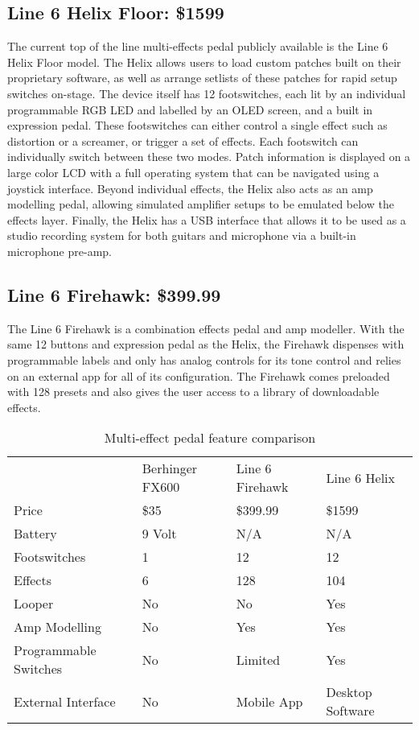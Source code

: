 \documentclass[journal,onecolumn,draftclsnofoot]{IEEEtran}
\begin{document}
\subsection{Line 6 Helix Floor: \$1599 \cite{helix}}
The current top of the line multi-effects pedal publicly available is the Line 6 Helix Floor model. The Helix allows users to load custom patches built on their proprietary software, as well as arrange setlists of these patches for rapid setup switches on-stage. The device itself has 12 footswitches, each lit by an individual programmable RGB LED and labelled by an OLED screen, and a built in expression pedal. These footswitches can either control a single effect such as distortion or a screamer, or trigger a set of effects. Each footswitch can individually switch between these two modes. Patch information is displayed on a large color LCD with a full operating system that can be navigated using a joystick interface. Beyond individual effects, the Helix also acts as an amp modelling pedal, allowing simulated amplifier setups to be emulated below the effects layer. Finally, the Helix has a USB interface that allows it to be used as a studio recording system for both guitars and microphone via a built-in microphone pre-amp.
\subsection{Line 6 Firehawk: \$399.99 \cite{firehawk}}
The Line 6 Firehawk is a combination effects pedal and amp modeller. With the same 12 buttons and expression pedal as the Helix, the Firehawk dispenses with programmable labels and only has analog controls for its tone control and relies on an external app for all of its configuration. The Firehawk comes preloaded with 128 presets and also gives the user access to a library of downloadable effects.
\begin{table}[]
\begin{tabularx}{\linewidth}{X|X|X|X|}
 & Berhinger FX600 & Line 6 Firehawk & Line 6 Helix \\
Price & \$35 & \$399.99 & \$1599 \\
Battery & 9 Volt & N/A & N/A \\
Footswitches & 1 & 12 & 12 \\
Effects & 6 & 128 & 104 \\
Looper & No & No & Yes \\
Amp Modelling & No & Yes & Yes \\
Programmable Switches & No & Limited & Yes \\
External Interface & No & Mobile App & Desktop Software
\end{tabularx}
\vspace{0.1cm}
\caption{Multi-effect pedal feature comparison}
\label{my-label}
\end{table}
\end{document}
